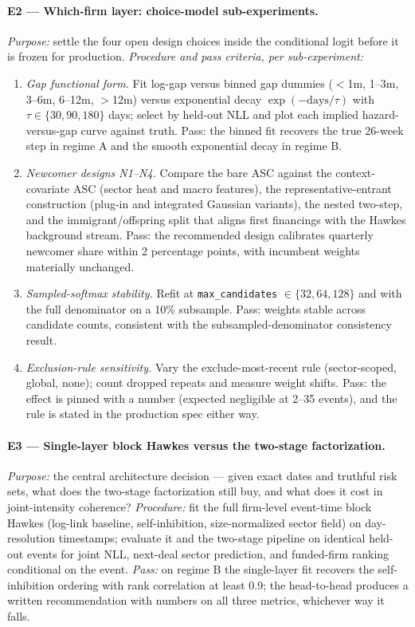 \paragraph{E2 --- Which-firm layer: choice-model sub-experiments.}
\emph{Purpose:} settle the four open design choices inside the conditional logit before it is frozen for
production. \emph{Procedure and pass criteria, per sub-experiment:}
\begin{enumerate}
\item \emph{Gap functional form.} Fit log-gap versus binned gap dummies ($<$1m, 1--3m, 3--6m, 6--12m,
$>$12m) versus exponential decay $\exp(-\text{days}/\tau)$ with $\tau \in \{30, 90, 180\}$ days; select by
held-out NLL and plot each implied hazard-versus-gap curve against truth. Pass: the binned fit recovers the
true 26-week step in regime A and the smooth exponential decay in regime B.
\item \emph{Newcomer designs N1--N4.} Compare the bare ASC against the context-covariate ASC (sector heat
and macro features), the representative-entrant construction (plug-in and integrated Gaussian variants),
the nested two-step, and the immigrant/offspring split that aligns first financings with the Hawkes
background stream. Pass: the recommended design calibrates quarterly newcomer share within 2 percentage
points, with incumbent weights materially unchanged.
\item \emph{Sampled-softmax stability.} Refit at \texttt{max\_candidates} $\in \{32, 64, 128\}$ and with
the full denominator on a 10\% subsample. Pass: weights stable across candidate counts, consistent with the
subsampled-denominator consistency result.
\item \emph{Exclusion-rule sensitivity.} Vary the exclude-most-recent rule (sector-scoped, global, none);
count dropped repeats and measure weight shifts. Pass: the effect is pinned with a number (expected
negligible at 2--35 events), and the rule is stated in the production spec either way.
\end{enumerate}

\paragraph{E3 --- Single-layer block Hawkes versus the two-stage factorization.}
\emph{Purpose:} the central architecture decision --- given exact dates and truthful risk sets, what does
the two-stage factorization still buy, and what does it cost in joint-intensity coherence?
\emph{Procedure:} fit the full firm-level event-time block Hawkes (log-link baseline, self-inhibition,
size-normalized sector field) on day-resolution timestamps; evaluate it and the two-stage pipeline on
identical held-out events for joint NLL, next-deal sector prediction, and funded-firm ranking conditional
on the event. \emph{Pass:} on regime B the single-layer fit recovers the self-inhibition ordering with rank
correlation at least 0.9; the head-to-head produces a written recommendation with numbers on all three
metrics, whichever way it falls.

